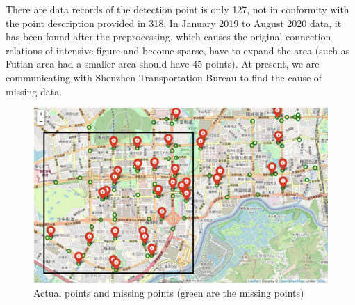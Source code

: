 \documentclass[fontset=none]{ctexart}
\theoremstyle{definition}
\theoremstyle{remark}
\begin{document}
There are data records of the detection point is only 127, not in conformity with the point description provided in 318, In January 2019 to August 2020 data, it has been found after the preprocessing, which causes the original connection relations of intensive figure and become sparse, have to expand the area (such as Futian area had a smaller area should have 45 points).  At present, we are communicating with Shenzhen Transportation Bureau to find the cause of missing data.
\begin{figure}[htb]
  \centering
  \includegraphics[width=\textwidth]{images/9-3-3.png}
  \caption{Actual points and missing points (green are the missing points)}
  \label{933}
\end{figure}

\clearpage
\end{document}
